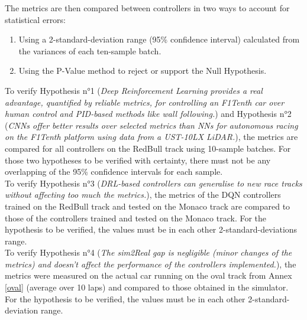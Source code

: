 The metrics are then compared between controllers in two ways to account for statistical errors:
\begin{enumerate}
	\item Using a 2-standard-deviation range (95\% confidence interval) calculated from the variances of each ten-sample batch. 
	\item Using the P-Value method to reject or support the Null Hypothesis.
\end{enumerate}

To verify Hypothesis n°1 (\textit{Deep Reinforcement Learning provides a real advantage, quantified by reliable metrics, for controlling an F1Tenth car over human control and PID-based methods like wall following.}) and Hypothesis n°2 (\textit{CNNs offer better results over selected metrics than NNs for autonomous racing on the F1Tenth platform using data from a UST-10LX LiDAR.}), the metrics are compared for all controllers on the RedBull track using 10-sample batches. For those two hypotheses to be verified with certainty, there must not be any overlapping of the 95\% confidence intervals for each sample. \\
To verify Hypothesis n°3 (\textit{DRL-based controllers can generalise to new race tracks without affecting too much the metrics.}), the metrics of the DQN controllers trained on the RedBull track and tested on the Monaco track are compared to those of the controllers trained and tested on the Monaco track. For the hypothesis to be verified, the values must be in each other 2-standard-deviations range. \\
To verify Hypothesis n°4 (\textit{The sim2Real gap is negligible (minor changes of the metrics) and doesn't affect the performance of the controllers implemented.}), the metrics were measured on the actual car running on the oval track from Annex \ref{oval} (average over 10 laps) and compared to those obtained in the simulator. For the hypothesis to be verified, the values must be in each other 2-standard-deviation range. 
